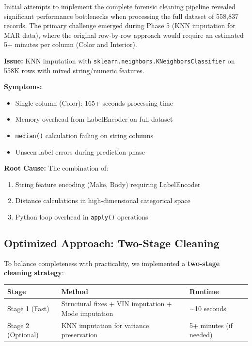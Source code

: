 \documentclass[12pt,a4paper]{article}
\begin{document}
Initial attempts to implement the complete forensic cleaning pipeline revealed significant performance bottlenecks when processing the full dataset of 558,837 records. The primary challenge emerged during Phase 5 (KNN imputation for MAR data), where the original row-by-row approach would require an estimated 5+ minutes per column (Color and Interior).

\begin{warningbox}
\textbf{Issue:} KNN imputation with \texttt{sklearn.neighbors.KNeighborsClassifier} on 558K rows with mixed string/numeric features.

\textbf{Symptoms:}
\begin{itemize}
    \item Single column (Color): 165+ seconds processing time
    \item Memory overhead from LabelEncoder on full dataset
    \item \texttt{median()} calculation failing on string columns
    \item Unseen label errors during prediction phase
\end{itemize}

\textbf{Root Cause:} The combination of:
\begin{enumerate}
    \item String feature encoding (Make, Body) requiring LabelEncoder
    \item Distance calculations in high-dimensional categorical space
    \item Python loop overhead in \texttt{apply()} operations
\end{enumerate}
\end{warningbox}

\subsection{Optimized Approach: Two-Stage Cleaning}

To balance completeness with practicality, we implemented a \textbf{two-stage cleaning strategy}:

\begin{center}
\begin{tabular}{p{3cm}p{5cm}p{5cm}}
\toprule
\textbf{Stage} & \textbf{Method} & \textbf{Runtime} \\
\midrule
Stage 1 (Fast) & Structural fixes + VIN imputation + Mode imputation & $\sim$10 seconds \\
Stage 2 (Optional) & KNN imputation for variance preservation & 5+ minutes (if needed) \\
\bottomrule
\end{tabular}
\end{center}
\end{document}
